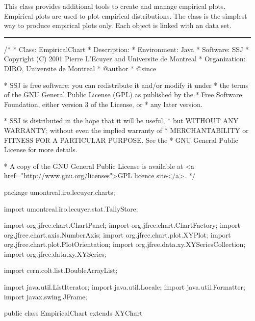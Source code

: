 
This class provides additional tools to create and manage empirical
plots. Empirical plots are used to plot empirical distributions. The
 class is the simplest way to produce empirical
  plots only. Each  object is linked with an
data set.

\bigskip\hrule
\begin{code}
\begin{hide}
/*
 * Class:        EmpiricalChart
 * Description:  
 * Environment:  Java
 * Software:     SSJ 
 * Copyright (C) 2001  Pierre L'Ecuyer and Universite de Montreal
 * Organization: DIRO, Universite de Montreal
 * @author       
 * @since

 * SSJ is free software: you can redistribute it and/or modify it under
 * the terms of the GNU General Public License (GPL) as published by the
 * Free Software Foundation, either version 3 of the License, or
 * any later version.

 * SSJ is distributed in the hope that it will be useful,
 * but WITHOUT ANY WARRANTY; without even the implied warranty of
 * MERCHANTABILITY or FITNESS FOR A PARTICULAR PURPOSE.  See the
 * GNU General Public License for more details.

 * A copy of the GNU General Public License is available at
   <a href="http://www.gnu.org/licenses">GPL licence site</a>.
 */
\end{hide}
package umontreal.iro.lecuyer.charts;\begin{hide}

import   umontreal.iro.lecuyer.stat.TallyStore;

import   org.jfree.chart.ChartPanel;
import   org.jfree.chart.ChartFactory;
import   org.jfree.chart.axis.NumberAxis;
import   org.jfree.chart.plot.XYPlot;
import   org.jfree.chart.plot.PlotOrientation;
import   org.jfree.data.xy.XYSeriesCollection;
import   org.jfree.data.xy.XYSeries;

import   cern.colt.list.DoubleArrayList;

import   java.util.ListIterator;
import   java.util.Locale;
import   java.util.Formatter;
import   javax.swing.JFrame;\end{hide}

public class EmpiricalChart extends XYChart \begin{hide} {

}
\end{hide}
\end{code}

